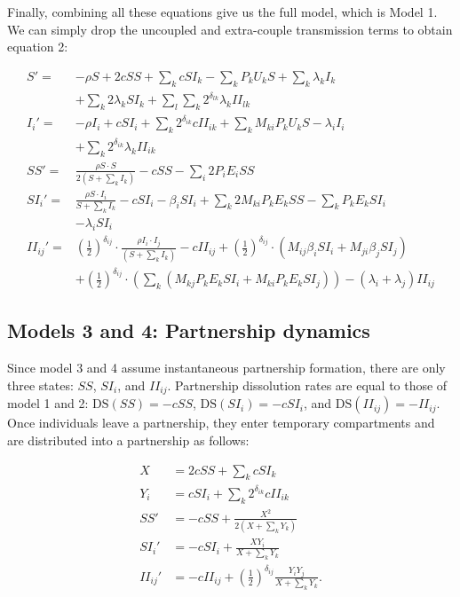 \documentclass[10pt,letterpaper]{article}
\newcommand{\khalf}{\left(\frac{1}{2}\right)^{\delta_{ij}}}  %
\newcommand{\DS}{\textrm{DS}}
\begin{document}
Finally, combining all these equations give us the full model, which is Model 1. We can simply drop the uncoupled and extra-couple transmission terms to obtain equation 2:

\begin{equation}
\begin{aligned}
S' =& - \rho S + 2 c SS + \sum_k c SI_k - \sum_k P_k U_k S + \sum_k \lambda_k I_k \\
&+ \sum_k 2 \lambda_k SI_k + \sum_l \sum_k  2^{\delta_{lk}} \lambda_k II_{lk}\\
I_i' =&  - \rho I_i + c SI_i + \sum_k 2^{\delta_{ik}} c  II_{ik} + \sum_k M_{ki} P_k U_k S- \lambda_i I_i \\
&+ \sum_k 2^{\delta_{ik}} \lambda_k II_{ik} \\
SS' =& \frac{\rho S \cdot S}{2 (S + \sum_k I_k)} - c SS - \sum_i 2 P_i E_i SS \\
SI_i' =& \frac{\rho S \cdot I_i}{S + \sum_k I_k} - c SI_i - \beta_i SI_i + \sum_k 2 M_{ki} P_k E_k SS - \sum_k P_k E_k SI_i   \\
&- \lambda_i SI_i\\
II_{ij}' =& \khalf \cdot \frac{\rho I_i \cdot I_j}{(S + \sum_k I_k)} - c II_{ij} + \khalf \cdot (M_{ij} \beta_i SI_i + M_{ji} \beta_j SI_j) \\
&+ \khalf \cdot (\sum_k (M_{kj} P_k E_k SI_i + M_{ki} P_k E_k SI_j)) -(\lambda_i + \lambda_j) II_{ij}
\end{aligned}
\end{equation}

\subsection*{Models 3 and 4: Partnership dynamics}

Since model 3 and 4 assume instantaneous partnership formation, there are only three states: $SS$, $SI_i$, and $II_{ij}$. Partnership dissolution rates are equal to those of model 1 and 2: $\DS(SS) = -cSS$, $\DS(SI_i) = - cSI_i$, and $\DS(II_{ij}) = - II_{ij}$. Once individuals leave a partnership, they enter temporary compartments and are distributed into a partnership as follows:

\begin{equation}
\begin{aligned}
X &= 2 c SS + \sum_k c SI_k \\
Y_i &= c SI_i + \sum_k 2^{\delta_{ik}} c II_{ik} \\
SS' &= - c SS + \frac{X^2}{2 (X + \sum_k Y_k)}\\
SI_i' &= - c SI_i + \frac{X Y_i}{X + \sum_k Y_k}\\
II_{ij}' &= - c II_{ij} +\khalf \frac{Y_i Y_j}{X + \sum_k Y_k}.
\end{aligned}
\end{equation}
\end{document}
